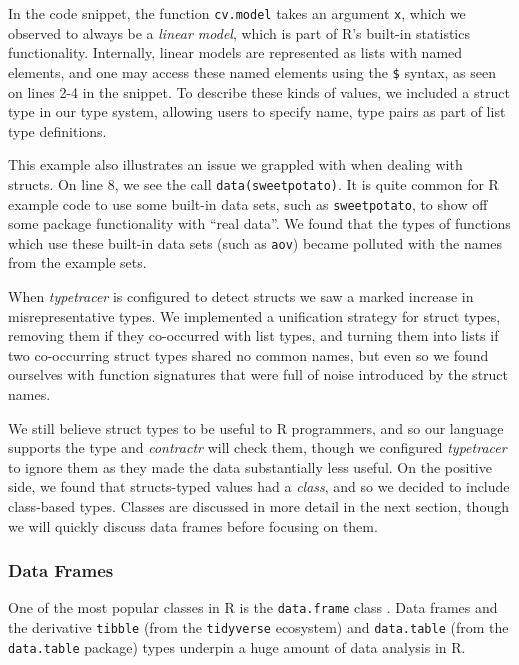 \documentclass[acmsmall,review,anonymous]{acmart}\settopmatter{printfolios=true,printccs=false,printacmref=false}
\newcommand{\code}[1]{{\lstinline[style=Rin]!#1!}\xspace}
\newcommand{\contractr}{\emph{contractr}\xspace} %
\newcommand{\typetracer}{\emph{typetracer}\xspace} %
\begin{document}
In the code snippet, the function \code{cv.model} takes an argument \code{x}, which we observed to always be a {\it linear model}, which is part of R's built-in statistics functionality.
Internally, linear models are represented as lists with named elements, and one may access these named elements using the \code{$} syntax, as seen on lines 2-4 in the snippet.
To describe these kinds of values, we included a struct type in our type system, allowing users to specify name, type pairs as part of list type definitions.

This example also illustrates an issue we grappled with when dealing with structs.
On line 8, we see the call \code{data(sweetpotato)}.
It is quite common for R example code to use some built-in data sets, such as \code{sweetpotato}, to show off some package functionality with ``real data''.
We found that the types of functions which use these built-in data sets (such as \code{aov}) became polluted with the names from the example sets.


When \typetracer is configured to detect structs we saw a marked increase in misrepresentative types.
We implemented a unification strategy for struct types, removing them if they co-occurred with list types, and turning them into lists if two co-occurring struct types shared no common names, but even so we found ourselves with function signatures that were full of noise introduced by the struct names.

We still believe struct types to be useful to R programmers, and so our language supports the type and \contractr will check them, though we configured \typetracer to ignore them as they made the data substantially less useful.
On the positive side, we found that  structs-typed values had a {\it class}, and so we decided to include class-based types.
Classes are discussed in more detail in the next section, though we will quickly discuss data frames before focusing on them. 

%
%
\subsubsection{Data Frames}

One of the most popular classes in R is the \code{data.frame} class .
Data frames and the derivative \code{tibble} (from the \code{tidyverse} ecosystem) and \code{data.table} (from the \code{data.table} package) types underpin a huge amount of data analysis in R.
\end{document}
